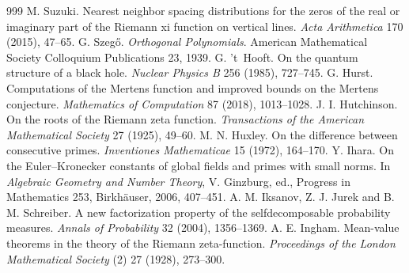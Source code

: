 \begin{thebibliography}{999}
 M. Suzuki. Nearest neighbor spacing distributions for the zeros of the real or imaginary part of the Riemann xi function on vertical lines. \emph{Acta Arithmetica} 170 (2015), 47--65.
 G. Szeg\H o. \emph{Orthogonal Polynomials}. American Mathematical Society Colloquium Publications 23, 1939.
 G. 't~Hooft. On the quantum structure of a black hole. \emph{Nuclear Physics B} 256 (1985), 727--745.
 G. Hurst. Computations of the Mertens function and improved bounds on the Mertens conjecture. \emph{Mathematics of Computation} 87 (2018), 1013--1028.
 J. I. Hutchinson. On the roots of the Riemann zeta function. \emph{Transactions of the American Mathematical Society} 27 (1925), 49--60.
 M. N. Huxley. On the difference between consecutive primes. \emph{Inventiones Mathematicae} 15 (1972), 164--170.
 Y. Ihara. On the Euler--Kronecker constants of global fields and primes with small norms. In \emph{Algebraic Geometry and Number Theory}, V. Ginzburg, ed., Progress in Mathematics 253, Birkh\"auser, 2006, 407--451.
 A. M. Iksanov, Z. J. Jurek and B. M. Schreiber. A new factorization property of the selfdecomposable probability measures. \emph{Annals of Probability} 32 (2004), 1356--1369.
 A. E. Ingham. Mean-value theorems in the theory of the Riemann zeta-function. \emph{Proceedings of the London Mathematical Society} (2) 27 (1928), 273--300.

\end{thebibliography}
